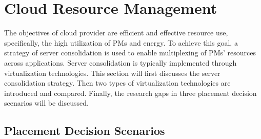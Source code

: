 \section{Cloud Resource Management}
\label{resource_management}
 The objectives of cloud provider are efficient and effective resource use, specifically, the high utilization of PMs and energy. To achieve this goal, a strategy of server consolidation is used to enable multiplexing of PMs' resources across applications. Server consolidation is typically implemented through virtualization technologies. This section will first discusses the server consolidation strategy. Then two types of virtualization technologies are introduced and compared. Finally, the research gaps in three placement decision scenarios will be discussed.



\subsection{Placement Decision Scenarios}
\label{scenarios}


